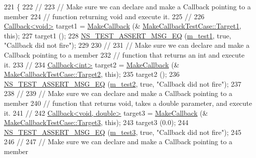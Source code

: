 \begin{DoxyCode}
221 \{
222   \textcolor{comment}{//}
223   \textcolor{comment}{// Make sure we can declare and make a Callback pointing to a member }
224   \textcolor{comment}{// function returning void and execute it.}
225   \textcolor{comment}{//}
226   \hyperlink{classns3_1_1Callback}{Callback<void>} target1 = \hyperlink{group__makecallbackmemptr_ga9376283685aa99d204048d6a4b7610a4}{MakeCallback} (&
      \hyperlink{classMakeCallbackTestCase_aabac2514df85bd85e1dec5c2dbd89ffb}{MakeCallbackTestCase::Target1}, \textcolor{keyword}{this});
227   target1 ();
228   \hyperlink{group__testing_ga2a9d78cffb3db8e867c35fff0b698cf5}{NS\_TEST\_ASSERT\_MSG\_EQ} (\hyperlink{classMakeCallbackTestCase_a66b6af95072f94d66be7c35f67525f02}{m\_test1}, \textcolor{keyword}{true}, \textcolor{stringliteral}{"Callback did not fire"});
229 
230   \textcolor{comment}{//}
231   \textcolor{comment}{// Make sure we can declare and make a Callback pointing to a member }
232   \textcolor{comment}{// function that returns an int and execute it.}
233   \textcolor{comment}{//}
234   \hyperlink{classns3_1_1Callback}{Callback<int>} target2 = \hyperlink{group__makecallbackmemptr_ga9376283685aa99d204048d6a4b7610a4}{MakeCallback} (&
      \hyperlink{classMakeCallbackTestCase_a8f3a0d047a67ec7347c7df8760bec8d9}{MakeCallbackTestCase::Target2}, \textcolor{keyword}{this});
235   target2 ();
236   \hyperlink{group__testing_ga2a9d78cffb3db8e867c35fff0b698cf5}{NS\_TEST\_ASSERT\_MSG\_EQ} (\hyperlink{classMakeCallbackTestCase_ac51832a1dad4c4161665aa06eeb35e0e}{m\_test2}, \textcolor{keyword}{true}, \textcolor{stringliteral}{"Callback did not fire"});
237 
238   \textcolor{comment}{//}
239   \textcolor{comment}{// Make sure we can declare and make a Callback pointing to a member }
240   \textcolor{comment}{// function that returns void, takes a double parameter, and execute it.}
241   \textcolor{comment}{//}
242   \hyperlink{classns3_1_1Callback}{Callback<void, double>} target3 = \hyperlink{group__makecallbackmemptr_ga9376283685aa99d204048d6a4b7610a4}{MakeCallback} (&
      \hyperlink{classMakeCallbackTestCase_af54380b176c6f0c91d4866bad7e8cab1}{MakeCallbackTestCase::Target3}, \textcolor{keyword}{this});
243   target3 (0.0);
244   \hyperlink{group__testing_ga2a9d78cffb3db8e867c35fff0b698cf5}{NS\_TEST\_ASSERT\_MSG\_EQ} (\hyperlink{classMakeCallbackTestCase_afa1e7a6b428e77a5cdeb0cdfb05ef325}{m\_test3}, \textcolor{keyword}{true}, \textcolor{stringliteral}{"Callback did not fire"});
245 
246   \textcolor{comment}{//}
247   \textcolor{comment}{// Make sure we can declare and make a Callback pointing to a member }

\end{DoxyCode}
